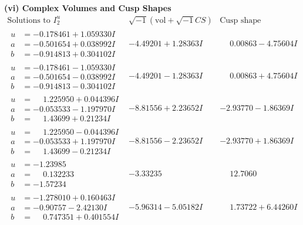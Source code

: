 \documentclass[1p]{elsarticle_modified}
\theoremstyle{definition}
\newcommand{\I}{\sqrt{-1}}
\begin{document}
\newpage\flushleft \textbf{(vi) Complex Volumes and Cusp Shapes}
$$\begin{array}{c|c|c}  
\text{Solutions to }I^u_{2}& \I (\text{vol} + \sqrt{-1}CS) & \text{Cusp shape}\\
 \hline 
\begin{aligned}
u &= -0.178461 + 1.059330 I \\
a &= -0.501654 + 0.038992 I \\
b &= -0.914813 + 0.304102 I\end{aligned}
 & -4.49201 + 1.28363 I & \phantom{-}0.00863 - 4.75604 I \\ \hline\begin{aligned}
u &= -0.178461 - 1.059330 I \\
a &= -0.501654 - 0.038992 I \\
b &= -0.914813 - 0.304102 I\end{aligned}
 & -4.49201 - 1.28363 I & \phantom{-}0.00863 + 4.75604 I \\ \hline\begin{aligned}
u &= \phantom{-}1.225950 + 0.044396 I \\
a &= -0.053533 - 1.197970 I \\
b &= \phantom{-}1.43699 + 0.21234 I\end{aligned}
 & -8.81556 + 2.23652 I & -2.93770 - 1.86369 I \\ \hline\begin{aligned}
u &= \phantom{-}1.225950 - 0.044396 I \\
a &= -0.053533 + 1.197970 I \\
b &= \phantom{-}1.43699 - 0.21234 I\end{aligned}
 & -8.81556 - 2.23652 I & -2.93770 + 1.86369 I \\ \hline\begin{aligned}
u &= -1.23985\phantom{ +0.000000I} \\
a &= \phantom{-}0.132233\phantom{ +0.000000I} \\
b &= -1.57234\phantom{ +0.000000I}\end{aligned}
 & -3.33235\phantom{ +0.000000I} & \phantom{-}12.7060\phantom{ +0.000000I} \\ \hline\begin{aligned}
u &= -1.278010 + 0.160463 I \\
a &= -0.90757 - 2.42130 I \\
b &= \phantom{-}0.747351 + 0.401554 I\end{aligned}
 & -5.96314 - 5.05182 I & \phantom{-}1.73722 + 6.44260 I \\ \hline\begin{aligned}

\end{aligned}
\end{array}$$
\end{document}
